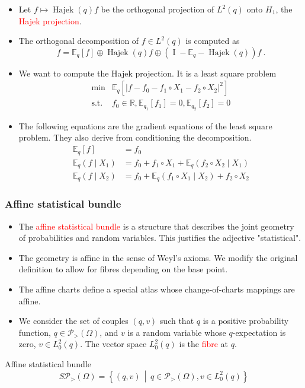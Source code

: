 \documentclass[xcolor=svgnames]{beamer}
\DeclareMathOperator{\Hajek}{Hajek}
\newcommand{\avalof}[1]{\left\vert#1\right\vert}
\newcommand{\condexpat}[3]{\mathbb E_{#1}\left(#2 \middle| #3\right)}
\newcommand{\expectat}[2]{\mathbb E_{#1}\left[#2\right]}
\newcommand{\hajekof}[1]{\Hajek\left(#1\right)}
\newcommand{\opensimplexon}[1]{\mathcal P_>\left(#1\right)}
\newcommand{\reals}{\mathbb{R}}
\newcommand{\rosso}[1]{\textcolor{red}{#1}}
\newcommand{\setof}[2]{\left\{#1 \, \middle| \, #2 \right\}}
\renewcommand{\emph}{\rosso}
\begin{document}
\begin{frame}
\begin{itemize}
    \item Let $f \mapsto \hajekof q f$ be the orthogonal projection of $L^2(q)$ onto $H_1$, the \emph{Hajek projection}.
    \item The orthogonal decomposition of $f \in L^2(q)$ is computed as
    \begin{equation*}
        f = \expectat q f \oplus \hajekof q f \oplus (\operatorname I  - 
 \mathbb E_q - \hajekof q) f \ .
    \end{equation*}
    \item We want to compute the Hajek projection. It is a least square problem
    \begin{align*}
    \min& \expectat q {\avalof {f - f_0 - f_1\circ X_1 - f_2\circ X_2}^2} \\    
    \text{s.t.}& f_0 \in \reals, \expectat {q_1} {f_1} = 0, \expectat {q_2} {f_2} = 0
    \end{align*}
    \item The following equations are the gradient equations of the least square problem. They also derive from conditioning the decomposition.
    \begin{align*}
        \expectat q {f} &= f_0 \\
        \condexpat q {f}{X_1} &= f_0 + f_1\circ X_1 + \condexpat q {f_2 \circ X_2}{X_1} \\ 
            \condexpat q {f}{X_2} &= f_0 + \condexpat q {f_1 \circ X_1}{X_2} + f_2\circ X_2
        \end{align*}
\end{itemize}
\end{frame}

\begin{frame}[plain]\small\frametitle{Affine statistical bundle}
\begin{itemize}
    \item The \emph{affine statistical bundle} is a structure that describes the joint geometry of probabilities and random variables. This justifies the adjective "statistical".
    \item The geometry is affine in the sense of Weyl's axioms. We modify the original definition to allow for fibres depending on the base point.
\item The affine charts define a special atlas whose change-of-charts mappings are affine.
\item We consider the set of couples $(q,v)$ such that $q$ is a positive probability function, $q \in \opensimplexon \Omega$, and $v$ is a random variable whose $q$-expectation is zero, $v \in L^2_0(q)$. The vector space $L_0^2(q)$ is the \emph{fibre} at $q$.
\end{itemize} 

\begin{block}{Affine statistical bundle}
    \begin{equation*}
        S\opensimplexon \Omega = \setof{(q,v)}{q \in \opensimplexon \Omega, v \in L^2_0(q)}
    \end{equation*}
\end{block}
\end{frame}
\end{document}
